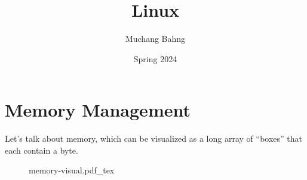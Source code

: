 \documentclass{article}
\newcommand{\incfig}[2][1]{%
    \def\svgwidth{#1\columnwidth}
    {#2.pdf\_tex}
  }
\begin{document}
\pagestyle{fancy}

\cfoot{\thepage / \pageref{LastPage}}


\title{Linux}
\author{Muchang Bahng}
\date{Spring 2024}

\maketitle

\tableofcontents

\pagebreak 

\section{Memory Management} 

Let's talk about memory, which can be visualized as a long array of ``boxes'' that each contain a byte. 

\begin{figure}[ht]
  \centering
  \incfig{memory-visual}
  \caption{}
  \label{fig:memory-visual}
\end{figure}
\end{document}
